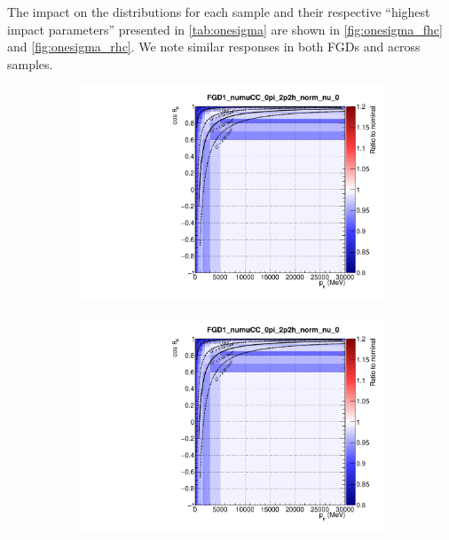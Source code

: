 The impact on the \pmu \cosmu distributions for each sample and their respective ``highest impact parameters'' presented in \autoref{tab:onesigma} are shown in \autoref{fig:onesigma_fhc} and \autoref{fig:onesigma_rhc}. We note similar responses in both FGDs and across samples.
\begin{figure}[h]
	\begin{subfigure}[t]{0.24\textwidth}
	\includegraphics[width=\textwidth,page=1]{figures/mach3/sigmavar/Full_1sigmaVar_18July_BeRPA_U_ND280_sigmavar_highest_all}
	\end{subfigure}
	\begin{subfigure}[t]{0.24\textwidth}
	\includegraphics[width=\textwidth,page=2]{figures/mach3/sigmavar/Full_1sigmaVar_18July_BeRPA_U_ND280_sigmavar_highest_all}
	\end{subfigure}

\end{figure}

